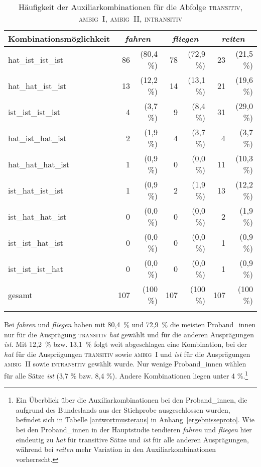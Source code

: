 \begin{table}
\begin{tabular}{l *3{r@{~}r}}
\lsptoprule
Kombinationsmöglichkeit & \multicolumn{2}{c}{\textit{fahren}} & \multicolumn{2}{c}{\textit{fliegen}} & \multicolumn{2}{c}{\textit{reiten}} \\\midrule
hat\_ist\_ist\_ist & 86 & (80,4 \%) & 78 & (72,9 \%) & 23 & (21,5 \%) \\ 
hat\_hat\_ist\_ist & 13 & (12,2 \%) & 14 & (13,1 \%) & 21 & (19,6 \%) \\
ist\_ist\_ist\_ist & 4  & (3,7 \%)  & 9  & (8,4 \%)  & 31 & (29,0 \%) \\ 
hat\_ist\_hat\_ist & 2  & (1,9 \%)  & 4  & (3,7 \%)  &  4 & (3,7 \%) \\ 
hat\_hat\_hat\_ist & 1  & (0,9 \%)  & 0  & (0,0 \%)  & 11 & (10,3 \%) \\  
ist\_hat\_ist\_ist & 1  & (0,9 \%)  & 2  & (1,9 \%)  & 13 & (12,2 \%) \\ 
ist\_hat\_hat\_ist & 0  & (0,0 \%)  & 0  & (0,0 \%)  &  2 & (1,9 \%) \\ 
ist\_ist\_hat\_ist & 0  & (0,0 \%)  & 0  & (0,0 \%)  &  1 & (0,9 \%) \\ 
ist\_ist\_ist\_hat & 0  & (0,0 \%)  & 0  & (0,0 \%)  &  1 & (0,9 \%) \\ 
\midrule
gesamt & 107 & (100 \%) & 107 & (100 \%) & 107 & (100 \%) \\
\lspbottomrule
\end{tabular}
\caption{Häufigkeit der Auxiliarkombinationen für die Abfolge \textsc{transitiv}, \textsc{ambig~I}, \textsc{ambig~II}, \textsc{intransitiv}}
\label{antwortmuster}
\end{table}

Bei \textit{fahren} und \textit{fliegen} haben mit 80,4~\% und 72,9~\% die meisten Proband\_innen nur für die Ausprägung \textsc{transitiv} \textit{hat} gewählt und für die anderen Ausprägungen \textit{ist}. Mit 12,2~\% bzw. 13,1~\% folgt weit abgeschlagen eine Kombination, bei der \textit{hat} für die Ausprägungen \textsc{transitiv} sowie \textsc{ambig~I} und \textit{ist} für die Ausprägungen \textsc{ambig~II} sowie \textsc{intransitiv} gewählt wurde. Nur wenige Proband\_innen wählen für alle Sätze \textit{ist} (3,7 \% bzw. 8,4 \%). Andere Kombinationen liegen unter 4 \%.\footnote{Ein Überblick über die Auxiliarkombinationen bei den Proband\_innen, die aufgrund des Bundeslands aus der Stichprobe ausgeschlossen wurden, befindet sich in Tabelle \ref{antwortmusteraus} in Anhang~\ref{ergebnisseproto}. Wie bei den Proband\_innen in der Hauptstudie tendieren \textit{fahren} und \textit{fliegen} hier eindeutig zu \textit{hat} für transitive Sätze und \textit{ist} für alle anderen Ausprägungen, während bei \textit{reiten} mehr Variation in den Auxiliarkombinationen vorherrscht.} 

